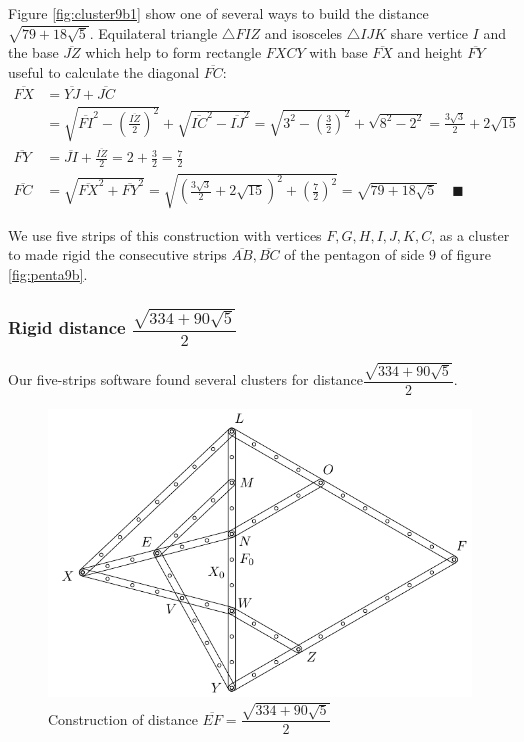\documentclass[11pt]{article}
\begin{document}
Figure \ref{fig:cluster9b1} show one of several ways to build the distance $\sqrt{79 + 18\sqrt5}$. 
Equilateral triangle $\triangle{FIZ}$ and isosceles $\triangle{IJK}$ share vertice $I$ and the base $\overline{JZ}$ which help to form rectangle $FXCY$ with base $\overline{FX}$ and height $\overline{FY}$ useful to calculate the diagonal $\overline{FC}$:
\begin{align}
\overline{FX} &= \overline{YJ} + \overline{JC}\nonumber\\
 &= \sqrt{\overline{FI}^2 - \left(\frac{\overline{IZ}}2\right)^2}
  + \sqrt{\overline{IC}^2 - \overline{IJ}^2}
  = \sqrt{3^2 - \left(\frac{3}2\right)^2} + \sqrt{8^2 - 2^2} 
  = \frac{3\sqrt3}2 + 2\sqrt{15} \nonumber\\
\overline{FY} &= \overline{JI} + \frac{\overline{IZ}}2
  = 2 + \frac{3}2 = \frac{7}2 \nonumber\\
\overline{FC} &= \sqrt{\overline{FX}^2 + \overline{FY}^2}
 = \sqrt{\left(\frac{3\sqrt3}2 + 2\sqrt{15}\right)^2 + \left(\frac{7}2\right)^2}
 = \sqrt{79 + 18\sqrt5} \quad\blacksquare
\end{align}

We use five strips of this construction with vertices $F,G,H,I,J,K,C$, as a cluster to made rigid the consecutive strips $\overline{AB},\overline{BC}$ of the pentagon of side $9$ of figure \ref{fig:penta9b}.


\subsubsection{Rigid distance $\dfrac{\sqrt{334 + 90\sqrt5}}2$}

Our five-strips software found several clusters for distance$\dfrac{\sqrt{334 + 90\sqrt5}}2$.

\begin{figure}[H]
\centering
\includegraphics[scale=1]{9/cluster9b2}
\caption{Construction of distance $\overline{EF}=\dfrac{\sqrt{334 + 90\sqrt5}}2$}
\label{fig:cluster9b2}
\end{figure}
\end{document}
